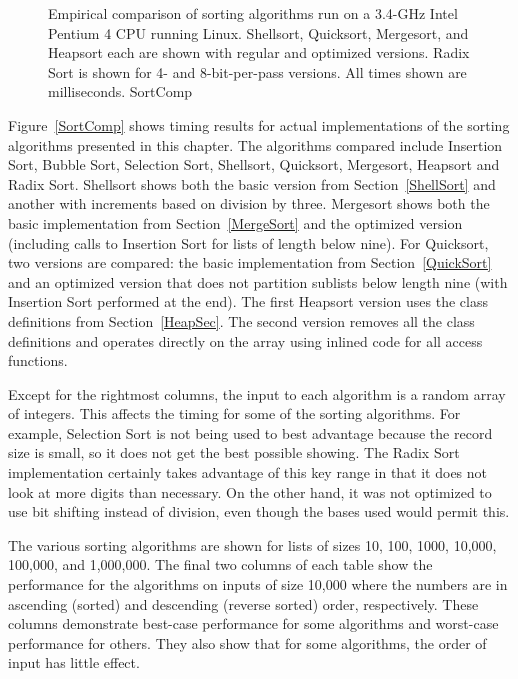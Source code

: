 \begin{figure}
\smallskip
{}
{Empirical comparison of sorting algorithms run on a 3.4-GHz Intel
Pentium 4 CPU running Linux.
Shellsort, Quicksort, Mergesort, and Heapsort each are shown with
regular and optimized versions.
Radix Sort is shown for 4- and 8-bit-per-pass versions.
All times shown are milliseconds.
}
{SortComp}
\bigskip
{}
\end{figure}

Figure~\ref{SortComp} shows timing results for
actual implementations of the sorting algorithms presented in this
chapter.
The algorithms compared include Insertion Sort, Bubble Sort,
Selection Sort, Shellsort, Quicksort, Mergesort, Heapsort and
Radix Sort.
Shellsort shows both the basic version from Section~\ref{ShellSort}
and another with increments based on division by three.
Mergesort shows both the basic implementation from
Section~\ref{MergeSort} and the optimized version
(including calls to Insertion Sort for lists of length below nine).
For Quicksort, two versions are compared: the basic implementation
from Section~\ref{QuickSort} and an optimized version
that does not partition sublists below length nine (with Insertion
Sort performed at the end).
The first Heapsort version uses the class definitions from
Section~\ref{HeapSec}.
The second version removes all the class definitions and operates
directly on the array using inlined code for all access functions.

Except for the rightmost columns,
the input to each algorithm is a random array of integers.
This affects the timing for some of the sorting algorithms.
For example, Selection Sort is not being used to best advantage
because the record size is small, so it does not get the best possible
showing.
The Radix Sort implementation certainly takes advantage of this
key range in that it does not look at more digits than necessary.
On the other hand, it was not optimized to use bit shifting instead of 
division, even though the bases used would permit this.

The various sorting algorithms are shown for lists of sizes
10, 100, 1000, 10,000, 100,000, and 1,000,000.
The final two columns of each table show the performance for the
algorithms on inputs of size 10,000 where the numbers are in
ascending (sorted) and descending (reverse sorted) order,
respectively.
These columns demonstrate best-case performance for some
algorithms and worst-case performance for others.
They also show that for some algorithms, the order of input
has little effect.

